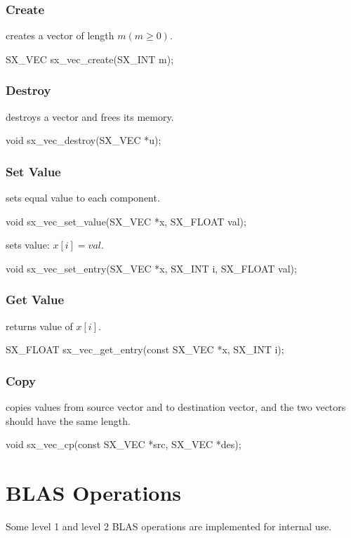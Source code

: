 \subsubsection{Create}
 creates a vector of length $m (m \ge 0)$.
\begin{evb}
SX_VEC sx_vec_create(SX_INT m);
\end{evb}

\subsubsection{Destroy}

 destroys a vector and frees its memory.
\begin{evb}
void sx_vec_destroy(SX_VEC *u);
\end{evb}

\subsubsection{Set Value}

 sets equal value to each component.
\begin{evb}
void sx_vec_set_value(SX_VEC *x, SX_FLOAT val);
\end{evb}

 sets value: $x[i] = val$.
\begin{evb}
void sx_vec_set_entry(SX_VEC *x, SX_INT i, SX_FLOAT val);
\end{evb}

\subsubsection{Get Value}
 returns value of $x[i]$.
\begin{evb}
SX_FLOAT sx_vec_get_entry(const SX_VEC *x, SX_INT i);
\end{evb}

\subsubsection{Copy}
 copies values from source vector and to destination vector, and the two vectors
should have the same length.
\begin{evb}
void sx_vec_cp(const SX_VEC *src, SX_VEC *des);
\end{evb}

\section{BLAS Operations}
Some level 1 and level 2 BLAS operations are implemented for internal use.

